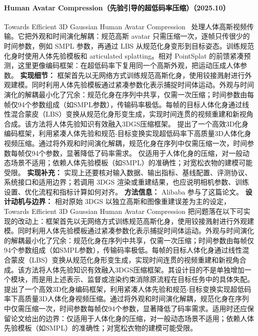 \paragraph{Human Avatar Compression（先验引导的超低码率压缩）（2025.10）}
Towards Efficient 3D Gaussian Human Avatar Compression~\cite{2510_10492} 处理人体高斯视频传输。它把外观和时间演化解耦：规范高斯 avatar 只需压缩一次，逐帧只传很少的时间参数，例如 SMPL 参数，再通过 LBS 从规范化身变形到目标姿态。训练规范化身时使用人体先验模板和 articulated splatting。相对 PointSplat 的前馈紧凑预测，这里更像编码框架：在超低码率下复用同一个高斯外观，把运动压成人体参数。
\textbf{实现细节：} 框架首先以无网络方式训练规范高斯化身，使用铰接溅射进行外观建模。同时利用人体先验模板通过紧凑参数化表示捕捉时间体运动。外观与时间演化的解耦最小化了冗余：规范化身在序列中共享，仅需一次压缩；时间参数由每帧仅94个参数组成（如SMPL参数），传输码率极低。每帧的目标人体化身通过线性混合蒙皮（LBS）变换从规范化身形变生成，实现时间连贯的视频重建和新视角合成。该方法将人体先验知识有效融入3DGS压缩框架。 提出了一个高效3D化身编码框架，利用紧凑人体先验和规范-目标变换实现超低码率下高质量3D人体化身视频压缩。通过将外观和时间演化解耦，规范化身在序列中仅需压缩一次，时间参数每帧仅94个参数，显著降低了码率需求。 仅适用于人体化身的压缩，对一般动态场景不适用；依赖人体先验模板（如SMPL）的准确性；对宽松衣物的建模可能受限。
\textbf{实现补充：} 实现上还要核对输入数据、输出指标、基线配置、评测协议、系统接口和适用边界；若调用 3DGS 渲染或重建结果，也应说明相机参数、训练设置、优化流程和指标计算如何对齐。
\textbf{方法信息：} Alibaba 参与了这篇论文。
\textbf{设计动机与边界：} 相对原始 3DGS 以独立高斯和图像重建误差为主的设定，Towards Efficient 3D Gaussian Human Avatar Compression 把问题落在以下可实现的改动上：框架首先以无网络方式训练规范高斯化身，使用铰接溅射进行外观建模。同时利用人体先验模板通过紧凑参数化表示捕捉时间体运动。外观与时间演化的解耦最小化了冗余：规范化身在序列中共享，仅需一次压缩；时间参数由每帧仅94个参数组成（如SMPL参数），传输码率极低。每帧的目标人体化身通过线性混合蒙皮（LBS）变换从规范化身形变生成，实现时间连贯的视频重建和新视角合成。该方法将人体先验知识有效融入3DGS压缩框架。其设计目的不是单独增加一个模块，而是用上述表示、监督或渲染约束消除原流程在目标任务中的具体失配。提出了一个高效3D化身编码框架，利用紧凑人体先验和规范-目标变换实现超低码率下高质量3D人体化身视频压缩。通过将外观和时间演化解耦，规范化身在序列中仅需压缩一次，时间参数每帧仅94个参数，显著降低了码率需求。适用时还应保留论文给出的边界：仅适用于人体化身的压缩，对一般动态场景不适用；依赖人体先验模板（如SMPL）的准确性；对宽松衣物的建模可能受限。
